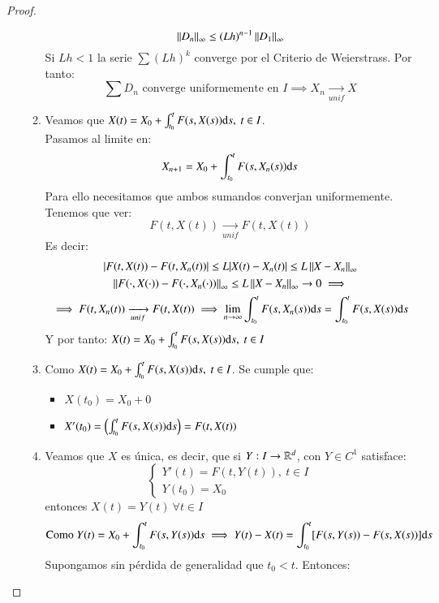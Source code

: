 \begin{proof}
\begin{enumerate}
\begin{enumerate}
        $$
            \left|\left|D_n\right|\right|_\infty \leq (Lh)^{n-1} \left|\left|D_1\right|\right|_\infty
        $$
        Si $Lh < 1$ la serie $\sum (Lh)^k$ converge por el Criterio de Weierstrass. Por tanto:
        $$
            \sum D_n \text{ converge uniformemente en } I \implies X_n\xrightarrow[unif]{} X
        $$
        \item Veamos que $X(t) = X_0 + \int_{t_0}^t F(s, X(s)) \mathrm{d} s,\ t\in I$.\\
        Pasamos al limite en:
        $$
            X_{n+1} = X_0 + \int_{t_0}^t F(s, X_{n}(s)) \mathrm{d} s
        $$
        Para ello necesitamos que ambos sumandos converjan uniformemente. Tenemos que ver:
        $$
            F(t, X(t)) \xrightarrow[unif]{} F(t, X(t))
        $$
        Es decir:
        \begin{gather*}
            |F(t, X(t)) - F(t, X_n(t))| \leq L |X(t) - X_n(t)| \leq L\left|\left|X-X_n\right|\right|_\infty\\
            \left|\left|F(\cdot, X(\cdot)) - F(\cdot, X_n(\cdot))\right|\right|_\infty \leq L \left|\left|X - X_n\right|\right|_\infty \to 0 \implies\\
            \implies F(t, X_n(t)) \xrightarrow[unif]{} F(t, X(t)) \implies \lim_{n\to \infty} \int_{t_0}^t F(s, X_n(s)) \mathrm{d} s = \int_{t_0}^t F(s, X(s)) \mathrm{d} s
        \end{gather*}
        Y por tanto:  $X(t) = X_0 + \int_{t_0}^t F(s, X(s)) \mathrm{d} s,\ t\in I$
        \item Como $X(t) = X_0 + \int_{t_0}^t F(s, X(s)) \mathrm{d} s,\ t\in I$. Se cumple que:\\
            \begin{itemize}
                \item $X(t_0) = X_0 + 0$
                \item $X'(t_0) = \left( \int_{t_0}^t F(s, X(s)) \mathrm{d} s \right) = F(t, X(t))$
            \end{itemize}
        \item Veamos que $X$ es única, es decir, que si $Y: I \to \mathbb{R}^d$, con $Y \in C^1$ satisface:
        $$
                \begin{cases}
                    Y'(t) = F(t, Y(t)),\ t\in I\\
                    Y(t_0) = X_0
                \end{cases}
        $$ entonces $X(t) = Y(t) \ \forall t \in I$\\
        $$
            \text{Como } Y(t) = X_0 + \int_{t_0}^t F(s, Y(s)) \mathrm{d} s \implies Y(t) - X(t) = \int_{t_0}^t [F(s, Y(s)) - F(s, X(s))] \mathrm{d} s
        $$
        Supongamos sin pérdida de generalidad que $t_0 < t$. Entonces:

\end{enumerate}
\end{enumerate}
\end{proof}
